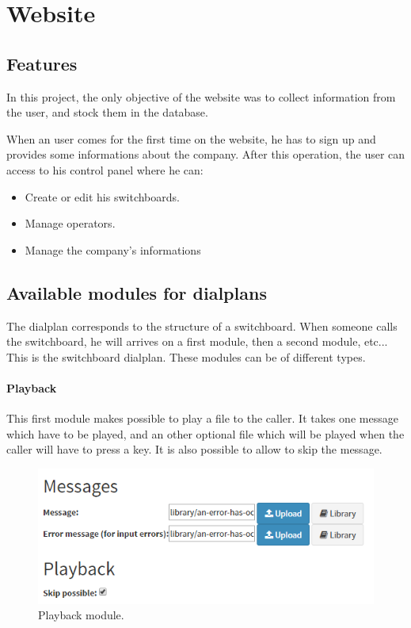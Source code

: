 \chapter{Website}
\section{Features}
In this project, the only objective of the website was to collect information from the user, and stock them in the database.

When an user comes for the first time on the website, he has to sign up and provides some informations about the company. After this operation, the user can access to his control panel where he can:
\begin{itemize}  
\item Create or edit his switchboards.
\item Manage operators\footnotemark.
\item Manage the company's informations
\end{itemize}  



\section{Available modules for dialplans}

The dialplan corresponds to the structure of a switchboard. When someone calls the switchboard, he will arrives on a first module, then a second module, etc... This is the switchboard dialplan. These modules can be of different types.

\subsubsection{Playback}
This first module makes possible to play a file to the caller. It takes one message which have to be played, and an other optional file which will be played when the caller will have to press a key.
It is also possible to allow to skip the message.

\begin{figure}[H]
  \caption{Playback module.}
  \centering
    \includegraphics[width=1\textwidth]{img/playback.png}
\end{figure}



